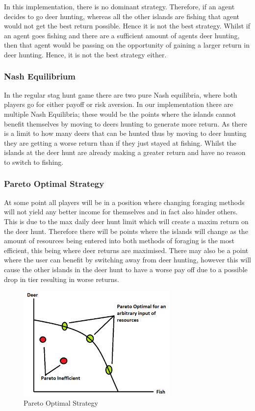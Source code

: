 In this implementation, there is no dominant strategy. Therefore, if an agent decides to go deer hunting, whereas all the other islands are fishing that agent would not get the best return possible. Hence it is not the best strategy. Whilst if an agent goes fishing and there are a sufficient amount of agents deer hunting, then that agent would be passing on the opportunity of gaining a larger return in deer hunting. Hence, it is not the best strategy either.

\subsubsection{Nash Equilibrium}

In the regular stag hunt game there are two pure Nash equilibria, where both players go for either payoff or risk aversion. In our implementation there are multiple Nash Equilibria; these would be the points where the islands cannot benefit themselves by moving to deers hunting to generate more return. As there is a limit to how many deers that can be hunted thus by moving to deer hunting they are getting a worse return than if they just stayed at fishing. Whilst the islands at the deer hunt are already making a greater return and have no reason to switch to fishing.

\subsubsection{Pareto Optimal Strategy}

At some point all players will be in a position where changing foraging methods will not yield any better income for themselves and in fact also hinder others. This is due to the max daily deer hunt limit which will create a maxim return on the deer hunt. Therefore there will be points where the islands will change as the amount of resources being entered into both methods of foraging is the most efficient, this being where deer returns are maximised. There may also be a point where the user can benefit by switching away from deer hunting, however this will cause the other islands in the deer hunt to have a worse pay off due to a possible drop in tier resulting in worse returns.

\begin{figure}[!htb]
    \centering
    \includegraphics[width=0.7\textwidth]{04_environment/Images/Pareto Optimal Strategy.PNG}
    \caption{Pareto Optimal Strategy}
    \label{fig:Pareto Optimal Strategy}
\end{figure}

